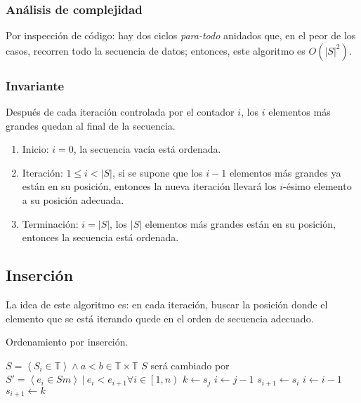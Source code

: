 \documentclass[]{article}
\begin{document}
\subsubsection{Análisis de complejidad} \label{algoritmos:mejorado:complejidad}

Por inspección de código: hay dos ciclos {\it para-todo} anidados que, en el peor de los casos, recorren todo la secuencia de datos; entonces, este algoritmo es $O(|S|^2)$.

\subsubsection{Invariante} \label{algoritmos:mejorado:invariante}

Después de cada iteración controlada por el contador $i$, los $i$ elementos más grandes quedan al final de la secuencia.

\begin{enumerate}
    \item Inicio: $i=0$, la secuencia vacía está ordenada.
    \item Iteración: $1 \le i<|S|$, si se supone que los $i-1$ elementos más grandes ya están en su posición, entonces la nueva iteración llevará los $i$-ésimo elemento a su posición adecuada.
    \item Terminación: $i=|S|$, los $|S|$ elementos más grandes están en su posición, entonces la secuencia está ordenada.
\end{enumerate}

\subsection{Inserción} \label{algoritmos:insercion}

La idea de este algoritmo es: en cada iteración, buscar la posición donde el elemento que se está iterando quede en el orden de secuencia adecuado.

\begin{algorithm}[!htb]
    \caption{Ordenamiento por inserción.}
    \begin{algorithmic}[1]
        \Require $S=\left< S_i \in \mathbb{T} \right> \land a<b \in \mathbb{T} \times \mathbb{T}$
        \Ensure $S$ será cambiado por $S' = \left< e_i \in S m\right> ~ | ~ e_i < e_{i+1} \forall i \in \left[1,n\right)$
        \State $k \leftarrow s_j$
        \State $i \leftarrow j - 1$
        \State $s_{i+1} \leftarrow s_i$
        \State $i \leftarrow i - 1$
        \EndWhile
        \State $s_{i+1} \leftarrow k$
        \EndFor
        \EndProcedure
    \end{algorithmic}
\end{algorithm}
\end{document}
